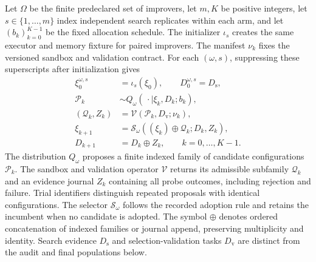 Let $\Omega$ be the finite predeclared set of improvers, let $m,K$ be positive integers, let $s\in\{1,\ldots,m\}$ index independent search replicates within each arm, and let $(b_k)_{k=0}^{K-1}$ be the fixed allocation schedule. The initializer $\iota_s$ creates the same executor and memory fixture for paired improvers. The manifest $\nu_k$ fixes the versioned sandbox and validation contract. For each $(\omega,s)$, suppressing these superscripts after initialization gives
\begin{equation}
\label{eq:C30:improver-search}
\begin{aligned}
 \xi_0^{\omega,s}&=\iota_s(\xi_0),\qquad D_0^{\omega,s}=D_{\mathrm s},\\
 \mathcal P_k&\sim Q_\omega(\,\cdot\mid\xi_k,D_k;b_k),\\
 (\mathcal Q_k,Z_k)&=\mathcal V(\mathcal P_k,D_{\mathrm v};\nu_k),\\
 \xi_{k+1}&=\mathcal S_\omega
       ((\xi_k)\oplus\mathcal Q_k;D_k,Z_k),\\
 D_{k+1}&=D_k\oplus Z_k,\qquad k=0,\ldots,K-1.
\end{aligned}
\end{equation}
The distribution $Q_\omega$ proposes a finite indexed family of candidate configurations $\mathcal P_k$. The sandbox and validation operator $\mathcal V$ returns its admissible subfamily $\mathcal Q_k$ and an evidence journal $Z_k$ containing all probe outcomes, including rejection and failure. Trial identifiers distinguish repeated proposals with identical configurations. The selector $\mathcal S_\omega$ follows the recorded adoption rule and retains the incumbent when no candidate is adopted. The symbol $\oplus$ denotes ordered concatenation of indexed families or journal append, preserving multiplicity and identity. Search evidence $D_{\mathrm s}$ and selection-validation tasks $D_{\mathrm v}$ are distinct from the audit and final populations below.

